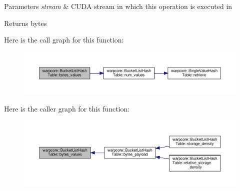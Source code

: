 \begin{DoxyParams}{Parameters}
{\em stream} & C\+U\+DA stream in which this operation is executed in \\
\hline
\end{DoxyParams}
\begin{DoxyReturn}{Returns}
bytes 
\end{DoxyReturn}
Here is the call graph for this function\+:
\nopagebreak
\begin{figure}[H]
\begin{center}
\leavevmode
\includegraphics[width=350pt]{classwarpcore_1_1BucketListHashTable_afbd37a57c5137cc44881470c80a60bc3_cgraph}
\end{center}
\end{figure}
Here is the caller graph for this function\+:
\nopagebreak
\begin{figure}[H]
\begin{center}
\leavevmode
\includegraphics[width=350pt]{classwarpcore_1_1BucketListHashTable_afbd37a57c5137cc44881470c80a60bc3_icgraph}
\end{center}
\end{figure}
\mbox{\label{classwarpcore_1_1BucketListHashTable_a3807ac1b39b47617d862c5dd17f21330}} 
